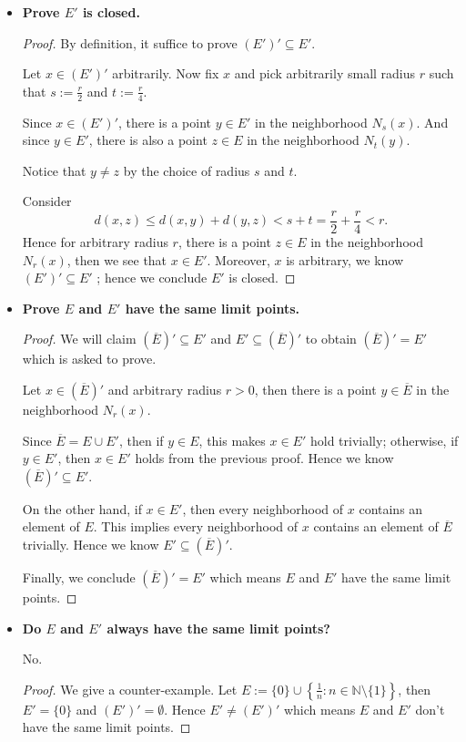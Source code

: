 \begin{Exercise}
	\begin{itemize}
		\item \textbf{Prove $E'$ is closed.}
		\begin{proof}
			By definition, it suffice to prove $(E')' \subseteq E'$. 
			
			Let $x\in (E')'$ arbitrarily. Now fix $x$ and pick arbitrarily small radius $r$ such that $s := \frac{r}{2}$ and $t := \frac{r}{4}$.
			
			Since $x\in (E')'$, there is a point $y\in E'$ in the neighborhood $N_s(x)$. And since $y\in E'$, there is also a point $z\in E$ in the neighborhood $N_t(y)$. 
			
			Notice that $y\neq z$ by the choice of radius $s$ and $t$.
			
			Consider
			$$
			d(x,z)
			\leq d(x,y) + d(y,z)
			< s + t
			= \frac{r}{2} + \frac{r}{4}
			< r.
			$$
			Hence for arbitrary radius $r$, there is a point $z\in E$ in the neighborhood $N_r(x)$, then we see that $x\in E'$. Moreover, $x$ is arbitrary, we know $(E')' \subseteq E'$ ; hence we conclude $E'$ is closed.
		\end{proof}
		
		\item \textbf{Prove $E$ and $E'$ have the same limit points.}
		
		\begin{proof}
			We will claim $(\overline{E})' \subseteq E'$ and $E' \subseteq (\overline{E})'$ to obtain $(\overline{E})' = E'$ which is asked to prove.
			
			Let $x\in (\overline{E})'$ and arbitrary radius $r > 0$, then there is a point $y\in \overline{E}$ in the neighborhood $N_r(x)$.
			
			Since $\overline{E} = E\cup E'$, then if $y\in E$, this makes $x\in E'$ hold trivially; otherwise, if $y\in E'$, then $x\in E'$ holds from the previous proof. Hence we know $(\overline{E})' \subseteq E'$.
			
			On the other hand, if $x\in E'$, then every neighborhood of $x$ contains an element of $E$. This implies every neighborhood of $x$ contains an element of $\overline{E}$ trivially. Hence we know $E' \subseteq (\overline{E})'$.
			
			Finally, we conclude $(\overline{E})' = E'$ which means $E$ and $E'$ have the same limit points.
		\end{proof}
		
		\item \textbf{Do $E$ and $E'$ always have the same limit points?}
		\begin{answer}
			No.
		\end{answer}
		\begin{proof}
			We give a counter-example.
			Let $E := \{0\} \cup \left\{ \frac{1}{n}:n\in\mathbb{N}\setminus\{1\} \right\}$, then $E' = \{0\}$ and $(E')' = \emptyset$. Hence $E' \neq (E')'$ which means $E$ and $E'$ don't have the same limit points.
		\end{proof}
	\end{itemize}
\end{Exercise}